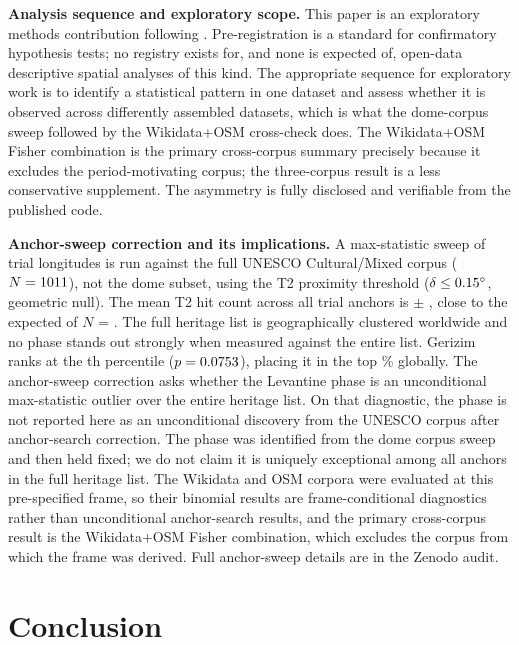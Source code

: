 \documentclass[12pt,a4paper]{article}
\newcommand{\degr}{\ifmmode^\circ\else\textdegree{}\fi}
\begin{document}
\noindent\textbf{Analysis sequence and exploratory scope.}
This paper is an exploratory methods contribution following
\citet{silva2020statistical}. Pre-registration is a standard for confirmatory
hypothesis tests; no registry exists for, and none is expected of,
open-data descriptive spatial analyses of this kind. The appropriate
sequence for exploratory work is to identify a statistical pattern in one
dataset and assess whether it is observed across differently assembled
datasets, which is what the dome-corpus sweep followed by the
Wikidata+OSM cross-check does. The Wikidata+OSM Fisher combination is the
primary cross-corpus summary precisely because it excludes the
period-motivating corpus; the three-corpus result is a less conservative
supplement. The asymmetry is fully disclosed and verifiable from the
published code.

\noindent\textbf{Anchor-sweep correction and its implications.}
A max-statistic sweep of \anchorSweepNanchors{} trial longitudes is run against
the full UNESCO Cultural/Mixed corpus ($N = 1011{}$), not the dome
subset, using the T2 proximity threshold ($\delta \leq \ApThreshDeg\degr$,
\NullRateAp{} geometric null). The mean T2 hit count across all \anchorSweepNanchors{}
trial anchors is \anchorSweepApMean{} $\pm$ \anchorSweepApStd{}, close to the
expected \NullRateAp{} of $N$ = \NclusterTotal{}. The full heritage list
is geographically clustered worldwide and no phase stands out strongly when
measured against the entire list. Gerizim ranks at the \anchorSweepPctile{}th
percentile ($p = 0.0753{}$), placing it in the top \anchorSweepTopPct{}\%
globally. The anchor-sweep correction asks whether the Levantine phase is
an unconditional max-statistic outlier over the entire heritage list. On
that diagnostic, the phase is not reported here as an unconditional
discovery from the UNESCO corpus after anchor-search correction.
The phase was identified from the dome corpus sweep and then held fixed; we do
not claim it is uniquely exceptional among all anchors in the full heritage list.
The Wikidata and OSM corpora were evaluated at this pre-specified frame, so their
binomial results are frame-conditional diagnostics rather than unconditional
anchor-search results, and the
primary cross-corpus result is the Wikidata+OSM Fisher combination, which
excludes the corpus from which the frame was derived. Full anchor-sweep details
are in the Zenodo audit.

\section{Conclusion}
\label{sec:conclusion}
\end{document}
